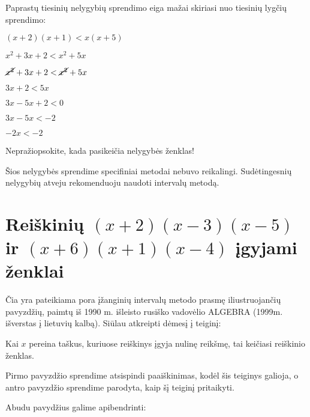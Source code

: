 \documentclass[a4paper,png]{article}
\begin{document}
Paprastų tiesinių nelygybių sprendimo eiga mažai skiriasi nuo tiesinių lygčių sprendimo: 

$(x+2)(x+1) < x(x+5) $

$ x^2+3x+2 < x^2+5x$

$\cancel{x^2}+3x+2 < \cancel{x^2}+5x $

$ 3x+2 < 5x $

$ 3x-5x+2 < 0 $

$ 3x-5x <-2 $

$ -2x <-2 $

 Nepražiopsokite, kada pasikeičia nelygybės ženklas!

Šios nelygybės sprendime specifiniai metodai nebuvo reikalingi. Sudėtingesnių nelygybių atveju rekomenduoju naudoti intervalų metodą.
\section*{Reiškinių $(x+2)(x-3)(x-5)$ ir $(x+6)(x+1)(x-4)$ įgyjami ženklai}
Čia yra pateikiama pora įžanginių intervalų metodo prasmę iliustruojančių pavyzdžių, paimtų iš 1990 m. išleisto rusiško vadovėlio ALGEBRA (1999m. išverstas į lietuvių kalbą). Siūlau atkreipti dėmesį į teiginį:

\begin{mdframed}[backgroundcolor=yellow!50!white]
Kai $x$ pereina taškus, kuriuose reiškinys įgyja nulinę reikšmę, tai keičiasi reiškinio ženklas.
\end{mdframed}

Pirmo pavyzdžio sprendime atsispindi paaiškinimas, kodėl šis teiginys galioja, o antro pavyzdžio sprendime parodyta, kaip šį teiginį pritaikyti.
\newline
\begin{minipage}[b]{0.49\textwidth}
\end{minipage}
\hspace{\fill}
\begin{minipage}[b]{0.49\textwidth}
\end{minipage}
\newline
\newline
Abudu pavydžius galime apibendrinti:
\newline
\newline
\begin{minipage}[m]{0.49\textwidth}
\end{minipage}
\hspace{\fill}
\begin{minipage}[b]{0.49\textwidth}
\end{minipage}
\renewcommand\thesection{}
\end{document}
